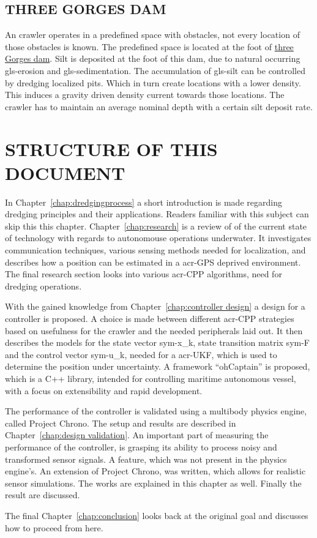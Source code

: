 \subsection{THREE GORGES DAM}\label{sec:usecase3}
An crawler operates in a predefined space with obstacles, not every location of those obstacles is known. The
predefined space is located at the foot of \href{https://www.google.nl/maps/place/Three+Gorges+Dam/@30.8263416,111
.0118356,16z/data=!4m2!3m1!1s0x368476d5e9a340d9:0xa017b4d524bd9d6c}{three Gorges dam}. Silt is deposited at the foot
of this dam, due to natural occurring \gls{gls-erosion} and \gls{gls-sedimentation}. The accumulation of
\gls{gls-silt} can be controlled by dredging localized pits. Which in turn create locations with a lower density.
This induces a gravity driven density current towards those locations. The crawler has to maintain an average nominal
depth with a certain silt deposit rate.

\section{STRUCTURE OF THIS DOCUMENT}\label{sec:structure of this document}

In Chapter~\ref{chap:dredgingprocess} a short introduction is made regarding dredging principles and their 
applications. Readers familiar with this subject can skip this this chapter. Chapter~\ref{chap:research} is a review 
of of the current state of technology with regards to autonomouse operations underwater. It investigates 
communication techniques, various sensing methods needed for localization, and describes how a position can be 
estimated in a \gls{acr-GPS} deprived environment. The final research section looks into various \gls{acr-CPP} 
algorithms, need for dredging operations.

With the gained knowledge from Chapter~\ref{chap:controller design} a design for a controller is proposed. A choice 
is made between different \gls{acr-CPP} strategies based on usefulness for the crawler and the needed peripherals 
laid out. It then describes the models for the state vector \gls{sym-x_k}, state transition matrix \gls{sym-F} and the
control vector \gls{sym-u_k}, needed for a \gls{acr-UKF}, which is used to determine the position under uncertainty. 
A framework ``ohCaptain'' is proposed, which is a C++ library, intended for controlling maritime autonomous vessel, 
with a focus on extensibility and rapid development.

The performance of the controller is validated using a multibody physics engine, called Project Chrono. The setup and
results are described in Chapter~\ref{chap:design validation}. An important part of measuring the performance of the 
controller, is grasping its ability to process noisy and transformed sensor signals. A feature, which was not present
in the physics engine's. An extension of Project Chrono, was written, which allows for realistic sensor simulations. 
The works are explained in this chapter as well. Finally the result are discussed.

\nodindent The final Chapter~\ref{chap:conclusion} looks back at the original goal and discusses how to proceed from 
here.